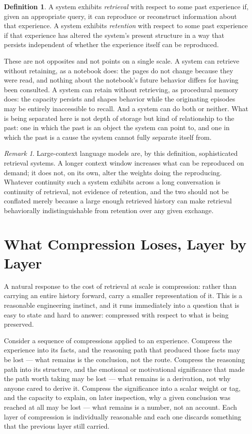 \documentclass[11pt]{amsart}
\theoremstyle{plain}
\theoremstyle{definition}
\newtheorem{definition}[theorem]{Definition}
\theoremstyle{remark}
\newtheorem{remark}[theorem]{Remark}
\begin{document}
\begin{definition}
A system exhibits \emph{retrieval} with respect to some past experience
if, given an appropriate query, it can reproduce or reconstruct
information about that experience. A system exhibits \emph{retention}
with respect to some past experience if that experience has altered the
system's present structure in a way that persists independent of
whether the experience itself can be reproduced.
\end{definition}

These are not opposites and not points on a single scale. A system can
retrieve without retaining, as a notebook does: the pages do not change
because they were read, and nothing about the notebook's future
behavior differs for having been consulted. A system can retain without
retrieving, as procedural memory does: the capacity persists and shapes
behavior while the originating episodes may be entirely inaccessible to
recall. And a system can do both or neither. What is being separated
here is not depth of storage but kind of relationship to the past: one
in which the past is an object the system can point to, and one in
which the past is a cause the system cannot fully separate itself from.

\begin{remark}
Large-context language models are, by this definition, sophisticated
retrieval systems. A longer context window increases what can be
reproduced on demand; it does not, on its own, alter the weights doing
the reproducing. Whatever continuity such a system exhibits across a
long conversation is continuity of retrieval, not evidence of
retention, and the two should not be conflated merely because a large
enough retrieved history can make retrieval behaviorally indistinguishable
from retention over any given exchange.
\end{remark}

\section{What Compression Loses, Layer by Layer}

A natural response to the cost of retrieval at scale is compression:
rather than carrying an entire history forward, carry a smaller
representation of it. This is a reasonable engineering instinct, and it
runs immediately into a question that is easy to state and hard to
answer: compressed with respect to what is being preserved.

Consider a sequence of compressions applied to an experience. Compress
the experience into its facts, and the reasoning path that produced
those facts may be lost --- what remains is the conclusion, not the
route. Compress the reasoning path into its structure, and the
emotional or motivational significance that made the path worth taking
may be lost --- what remains is a derivation, not why anyone cared to
derive it. Compress the significance into a scalar weight or tag, and
the capacity to explain, on later inspection, why a given conclusion
was reached at all may be lost --- what remains is a number, not an
account. Each layer of compression is individually reasonable and each
one discards something that the previous layer still carried.
\end{document}
